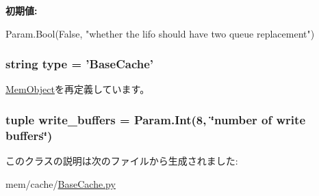 \label{classBaseCache_1_1BaseCache_a113d3ca0f38b0118d2e0c606bc1d742d}
{\bfseries 初期値:}
\begin{DoxyCode}
Param.Bool(False,
        "whether the lifo should have two queue replacement")
\end{DoxyCode}
\hypertarget{classBaseCache_1_1BaseCache_acce15679d830831b0bbe8ebc2a60b2ca}{
\subsubsection[{type}]{\setlength{\rightskip}{0pt plus 5cm}string {\bf type} = '{\bf BaseCache}'}}
\label{classBaseCache_1_1BaseCache_acce15679d830831b0bbe8ebc2a60b2ca}


\hyperlink{classMemObject_1_1MemObject_acce15679d830831b0bbe8ebc2a60b2ca}{MemObject}を再定義しています。\hypertarget{classBaseCache_1_1BaseCache_a890200fe0ea63598dec56b553da3bfb1}{
\subsubsection[{write\_\-buffers}]{\setlength{\rightskip}{0pt plus 5cm}tuple {\bf write\_\-buffers} = Param.Int(8, \char`\"{}number of write buffers\char`\"{})}}
\label{classBaseCache_1_1BaseCache_a890200fe0ea63598dec56b553da3bfb1}


このクラスの説明は次のファイルから生成されました:\begin{DoxyCompactItemize}
\item 
mem/cache/\hyperlink{BaseCache_8py}{BaseCache.py}\end{DoxyCompactItemize}
